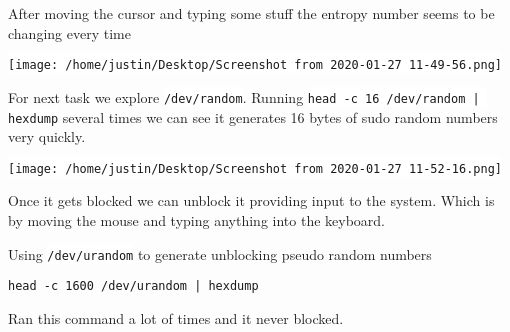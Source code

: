 \documentclass[11pt,letterpaper]{article}
\let\OldTexttt\texttt
\renewcommand{\texttt}[1]{\OldTexttt{\footnotesize\colorbox{background}{\textcolor{foreground}{#1}}}}
\begin{document}
After moving the cursor and typing some stuff the entropy number seems to be changing every time
\begin{center}
\texttt{[image: /home/justin/Desktop/Screenshot from 2020-01-27 11-49-56.png]}
\end{center}

For next task we explore \texttt{/dev/random}. Running \texttt{head -c 16 /dev/random | hexdump} several times we
can see it generates 16 bytes of sudo random numbers very quickly.

\begin{center}
\texttt{[image: /home/justin/Desktop/Screenshot from 2020-01-27 11-52-16.png]}
\end{center}

Once it gets blocked we can unblock it providing input to the system. Which is by moving the mouse
and typing anything into the keyboard.

Using \texttt{/dev/urandom} to generate unblocking pseudo random numbers 

\lstset{language=cpp,label= ,caption= ,captionpos=b,numbers=none}
\begin{lstlisting}
head -c 1600 /dev/urandom | hexdump
\end{lstlisting}

Ran this command a lot of times and it never blocked.
\end{document}
